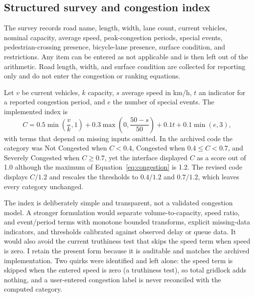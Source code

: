 \documentclass[11pt]{article}
\begin{document}
\subsection{Structured survey and congestion index}
The survey records road name, length, width, lane count, current vehicles, nominal capacity, average speed, peak-congestion periods, special events, pedestrian-crossing presence, bicycle-lane presence, surface condition, and restrictions. Any item can be entered as not applicable and is then left out of the arithmetic. Road length, width, and surface condition are collected for reporting only and do not enter the congestion or ranking equations.

Let $v$ be current vehicles, $k$ capacity, $s$ average speed in km/h, $t$ an indicator for a reported congestion period, and $e$ the number of special events. The implemented index is
\begin{equation}
C=0.5\min\left(\frac{v}{k},1\right)+0.3\max\left(0,\frac{50-s}{50}\right)+0.1t+0.1\min(e,3),
\label{eq:congestion}
\end{equation}
with terms that depend on missing inputs omitted. In the archived code the category was Not Congested when $C<0.4$, Congested when $0.4\le C<0.7$, and Severely Congested when $C\ge0.7$, yet the interface displayed $C$ as a score out of 1.0 although the maximum of Equation~\ref{eq:congestion} is 1.2. The revised code displays $C/1.2$ and rescales the thresholds to $0.4/1.2$ and $0.7/1.2$, which leaves every category unchanged.

The index is deliberately simple and transparent, not a validated congestion model. A stronger formulation would separate volume-to-capacity, speed ratio, and event/period terms with monotone bounded transforms, explicit missing-data indicators, and thresholds calibrated against observed delay or queue data. It would also avoid the current truthiness test that skips the speed term when speed is zero. I retain the present form because it is auditable and matches the archived implementation. Two quirks were identified and left alone: the speed term is skipped when the entered speed is zero (a truthiness test), so total gridlock adds nothing, and a user-entered congestion label is never reconciled with the computed category.
\end{document}
